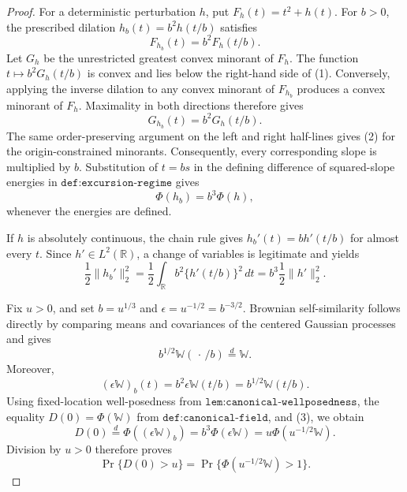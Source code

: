 \documentclass{article}
\begin{document}
\begin{proof}
For a deterministic perturbation \(h\), put \(F_h(t)=t^2+h(t)\).  For \(b>0\), the prescribed dilation \(h_b(t)=b^2h(t/b)\) satisfies
\[
 F_{h_b}(t)=b^2F_h(t/b). \tag{1}
\]
Let \(G_h\) be the unrestricted greatest convex minorant of \(F_h\).  The function \(t\mapsto b^2G_h(t/b)\) is convex and lies below the right-hand side of (1).  Conversely, applying the inverse dilation to any convex minorant of \(F_{h_b}\) produces a convex minorant of \(F_h\).  Maximality in both directions therefore gives
\[
 G_{h_b}(t)=b^2G_h(t/b). \tag{2}
\]
The same order-preserving argument on the left and right half-lines gives (2) for the origin-constrained minorants.  Consequently, every corresponding slope is multiplied by \(b\).  Substitution of \(t=bs\) in the defining difference of squared-slope energies in \(\texttt{def:excursion-regime}\) gives
\[
 \Phi(h_b)=b^3\Phi(h), \tag{3}
\]
whenever the energies are defined.

If \(h\) is absolutely continuous, the chain rule gives \(h_b'(t)=b h'(t/b)\) for almost every \(t\).  Since \(h'\in L^2(\mathbb R)\), a change of variables is legitimate and yields
\[
 \frac12\lVert h_b'\rVert_2^2
 =\frac12\int_{\mathbb R}b^2\{h'(t/b)\}^2\,dt
 =b^3\frac12\lVert h'\rVert_2^2. \tag{4}
\]

Fix \(u>0\), and set \(b=u^{1/3}\) and \(\epsilon=u^{-1/2}=b^{-3/2}\).  Brownian self-similarity follows directly by comparing means and covariances of the centered Gaussian processes and gives
\[
 b^{1/2}\mathbb W(\,\cdot\,/b)\stackrel{d}{=}\mathbb W.
\]
Moreover,
\[
 (\epsilon\mathbb W)_b(t)
 =b^2\epsilon\mathbb W(t/b)
 =b^{1/2}\mathbb W(t/b).
\]
Using fixed-location well-posedness from \(\texttt{lem:canonical-wellposedness}\), the equality \(D(0)=\Phi(\mathbb W)\) from \(\texttt{def:canonical-field}\), and (3), we obtain
\[
 D(0)\stackrel{d}{=}\Phi((\epsilon\mathbb W)_b)
 =b^3\Phi(\epsilon\mathbb W)
 =u\Phi(u^{-1/2}\mathbb W).
\]
Division by \(u>0\) therefore proves
\[
 \Pr\{D(0)>u\}=\Pr\{\Phi(u^{-1/2}\mathbb W)>1\}. \tag{5}
\]


\end{proof}
\end{document}

